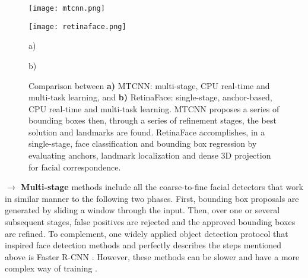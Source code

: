 \documentclass[class=report, crop=false, a4paper, 12pt]{standalone}
\begin{document}
\vspace{0.5\baselineskip}
\begin{figure}[h!]
    \centering
    \begin{minipage}[c]{0.38\textwidth}
      \centering
      \texttt{[image: mtcnn.png]}
      \label{fig:mtcnn}
    \end{minipage}
    \hspace{0.5cm}
    \begin{minipage}[c]{0.52\textwidth}
      \centering
      \texttt{[image: retinaface.png]}
      \label{fig:retinaface}
    \end{minipage} 
    \begin{minipage}{0.4\textwidth}
        \vspace{-0.5cm}
        \centering
        \footnotesize a)
    \end{minipage}
    \hfill
    \begin{minipage}{0.4\textwidth}
        \vspace{-0.5cm}
        \centering
        \footnotesize b)
    \end{minipage}
    \vspace{-0.4cm}
    \caption{Comparison between \textbf{a)} MTCNN: multi-stage, CPU real-time and multi-task learning, and \textbf{b)} RetinaFace: single-stage, anchor-based, CPU real-time and multi-task learning. MTCNN \autocite{zhangJointFaceDetection2016a} proposes a series of bounding boxes then, through a series of refinement stages, the best solution and landmarks are found. RetinaFace \autocite{dengRetinaFaceSinglestageDense2019} accomplishes, in a single-stage, face classification and bounding box regression by evaluating anchors, landmark localization and dense 3D projection for facial correspondence.}
    \label{fig:mtcnn vs retinaface}
\end{figure}
  

\noindent\textbf{$\rightarrow$ Multi-stage} methods \autocite{dengRetinaFaceSinglestageDense2019} include all the coarse-to-fine facial detectors that work in similar manner to the following two phases. First, bounding box proposals are generated by sliding a window through the input. Then, over one or several subsequent stages, false positives are rejected and the approved bounding boxes are refined. To complement, one widely applied object detection protocol that inspired face detection methods and perfectly describes the steps mentioned above is Faster R-CNN \autocite{renFasterRCNNRealTime2016}. However, these methods can be slower and have a more complex way of training \autocite{xuCenterFaceJointFace2019}.
\end{document}
